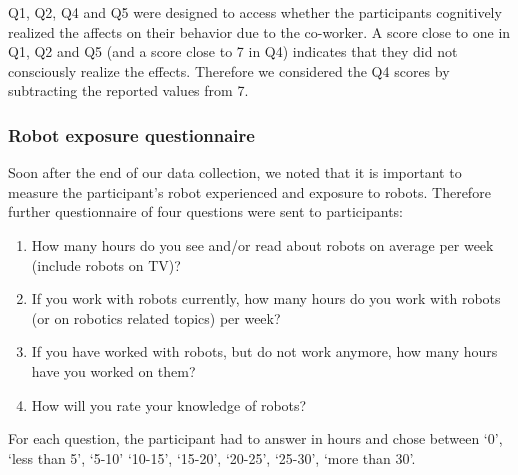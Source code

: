 Q1, Q2, Q4 and Q5 were designed to access whether the participants cognitively realized the affects on their behavior due to the co-worker. A score close to one in Q1, Q2 and Q5 (and a score close to 7 in Q4) indicates that they did not consciously realize the effects. Therefore we considered the Q4 scores by subtracting the reported values from 7.

\subsubsection{Robot exposure questionnaire}

Soon after the end of our data collection, we noted that it is important to measure the participant's robot experienced and exposure to robots. Therefore further questionnaire of four questions were sent to participants:

\begin{enumerate}[start=1,label={RQ\arabic*.}]
	\item How many hours do you see and/or read about robots on average per week (include robots on TV)?
	\item If you work with robots currently, how many hours do you work with robots (or on robotics related topics) per week?
	\item If you have worked with robots, but do not work anymore, how many hours have you worked on them?
	\item How will you rate your knowledge of robots?
\end{enumerate}

For each question, the participant had to answer in hours and chose between `0', `less than 5', `5-10' `10-15', `15-20', `20-25', `25-30', `more than 30'.



